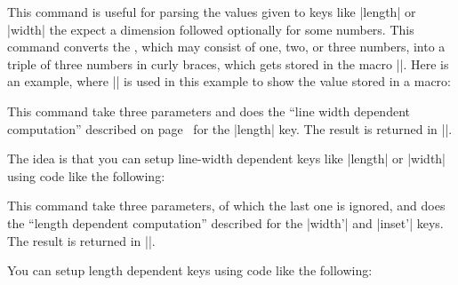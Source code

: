 \begin{command}{\pgfarrowsthreeparameters{}}
  This command is useful for parsing the values given to keys like
  |length| or |width| the expect a dimension followed optionally for
  some numbers. This command converts the , which may consist of one, two, or three
  numbers, into a triple of three numbers in curly braces, which gets
  stored in the macro |\pgfarrowstheparameters|. Here is an example,
  where |\showvalueofmacro| is used in this example to show the value
  stored in a macro:
  \makeatletter
  \def\showvalueofmacro#1{%
    \texttt{\expandafter\expandafter\expandafter\expandafter\expandafter\expandafter\expandafter\pgfutil@gobble\expandafter\expandafter\expandafter\string\expandafter\csname#1\endcsname}
  }
\begin{codeexample}[]
\showvalueofmacro\pgfarrowstheparameters 
\end{codeexample}
\end{command}


\begin{command}{\pgfarrowslinewidthdependent{}}
  This command take three parameters and does the ``line width
  dependent computation'' described on page~\pageref{length-arrow-key} 
  for the |length| key. The result is returned in |\pgf@x|.

  The idea is that you can setup line-width dependent keys like
  |length| or |width| using code like the following:
\begin{codeexample}[code only]
\pgfkeys{/pgf/arrow keys/depth/.code={%
  \pgfarrowsthreeparameters{#1}%
  \expandafter\pgfarrowsaddtolateoptions\expandafter{%
    \expandafter\pgfarrowslinewidthdependent\pgfarrowstheparameters%
    \pgfarrowdepth\pgf@x%
  }%
}    
\end{codeexample}
\end{command}



\begin{command}{\pgfarrowslengthdependent{}}
  This command take three parameters, of which the last one is
  ignored, and does the ``length dependent computation'' described for
  the |width'| and |inset'| keys. The result is returned in |\pgf@x|.

  You can setup length dependent keys using code like the following:
\begin{codeexample}[code only]
\pgfkeys{/pgf/arrow keys/depth'/.code={%
  \pgfarrowsthreeparameters{#1}%
  \expandafter\pgfarrowsaddtolateoptions\expandafter{%
    \expandafter\pgfarrowslengthdependent\pgfarrowstheparameters%
    \pgfarrowdepth\pgf@x%
  }%
}    
\end{codeexample}
\end{command}


